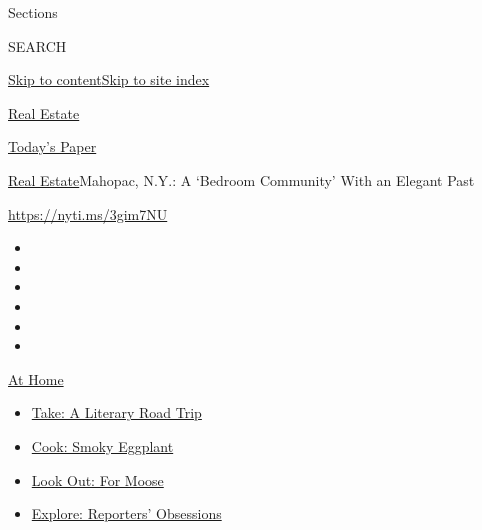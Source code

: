 Sections

SEARCH

\protect\hyperlink{site-content}{Skip to
content}\protect\hyperlink{site-index}{Skip to site index}

\href{https://www.nytimes3xbfgragh.onion/section/realestate}{Real
Estate}

\href{https://myaccount.nytimes3xbfgragh.onion/auth/login?response_type=cookie\&client_id=vi}{}

\href{https://www.nytimes3xbfgragh.onion/section/todayspaper}{Today's
Paper}

\href{/section/realestate}{Real Estate}\textbar{}Mahopac, N.Y.: A
`Bedroom Community' With an Elegant Past

\url{https://nyti.ms/3gim7NU}

\begin{itemize}
\item
\item
\item
\item
\item
\item
\end{itemize}

\href{https://www.nytimes3xbfgragh.onion/spotlight/at-home?action=click\&pgtype=Article\&state=default\&region=TOP_BANNER\&context=at_home_menu}{At
Home}

\begin{itemize}
\tightlist
\item
  \href{https://www.nytimes3xbfgragh.onion/2020/07/28/books/time-for-a-literary-road-trip.html?action=click\&pgtype=Article\&state=default\&region=TOP_BANNER\&context=at_home_menu}{Take:
  A Literary Road Trip}
\item
  \href{https://www.nytimes3xbfgragh.onion/2020/07/29/magazine/bored-with-your-home-cooking-some-smoky-eggplant-will-fix-that.html?action=click\&pgtype=Article\&state=default\&region=TOP_BANNER\&context=at_home_menu}{Cook:
  Smoky Eggplant}
\item
  \href{https://www.nytimes3xbfgragh.onion/2020/07/27/travel/moose-michigan-isle-royale.html?action=click\&pgtype=Article\&state=default\&region=TOP_BANNER\&context=at_home_menu}{Look
  Out: For Moose}
\item
  \href{https://www.nytimes3xbfgragh.onion/interactive/2020/at-home/even-more-reporters-editors-diaries-lists-recommendations.html?action=click\&pgtype=Article\&state=default\&region=TOP_BANNER\&context=at_home_menu}{Explore:
  Reporters' Obsessions}
\end{itemize}

